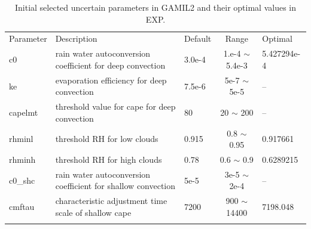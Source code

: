 \documentclass[gmd, manuscript]{copernicus}
\begin{document}
\clearpage






\begin{table}[t]
\caption{Initial selected uncertain parameters in GAMIL2 and their optimal values in EXP.}
\begin{tabular}{l l l c l}
\tophline
Parameter & Description & Default & Range & Optimal \\
\middlehline
c0 & rain water autoconversion coefficient for deep convection & 3.0e-4 & 1.e-4 $\sim$ 5.4e-3 & 5.427294e-4\\
ke & evaporation efficiency for deep convection & 7.5e-6 & 5e-7 $\sim$ 5e-5 & --\\
capelmt & threshold value for cape for deep convection & 80 & 20 $\sim$ 200 & --\\
rhminl & threshold RH for low clouds & 0.915 & 0.8 $\sim$ 0.95 & 0.917661 \\
rhminh & threshold RH for high clouds & 0.78 & 0.6 $\sim$ 0.9 & 0.6289215\\
c0\_shc & rain water autoconversion coefficient for shallow convection & 5e-5 & 3e-5 $\sim$ 2e-4 & -- \\
cmftau & characteristic adjustment time scale of shallow cape & 7200 & 900 $\sim$ 14400 & 7198.048 \\
\bottomhline
\end{tabular}
\belowtable{} %
\end{table}
\end{document}
